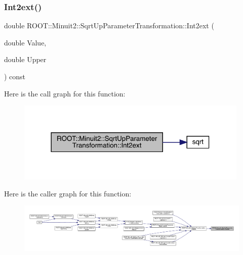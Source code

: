 \mbox{\label{classROOT_1_1Minuit2_1_1SqrtUpParameterTransformation_afd65e37e7e03cb9db5bf9906eb399fc8}} 
\subsubsection{\texorpdfstring{Int2ext()}{Int2ext()}\hspace{0.1cm}{\footnotesize\ttfamily [2/2]}}
{\footnotesize\ttfamily double R\+O\+O\+T\+::\+Minuit2\+::\+Sqrt\+Up\+Parameter\+Transformation\+::\+Int2ext (\begin{DoxyParamCaption}\item[{double}]{Value,  }\item[{double}]{Upper }\end{DoxyParamCaption}) const}

Here is the call graph for this function\+:\nopagebreak
\begin{figure}[H]
\begin{center}
\leavevmode
\includegraphics[width=314pt]{d4/d77/classROOT_1_1Minuit2_1_1SqrtUpParameterTransformation_afd65e37e7e03cb9db5bf9906eb399fc8_cgraph}
\end{center}
\end{figure}
Here is the caller graph for this function\+:\nopagebreak
\begin{figure}[H]
\begin{center}
\leavevmode
\includegraphics[width=350pt]{d4/d77/classROOT_1_1Minuit2_1_1SqrtUpParameterTransformation_afd65e37e7e03cb9db5bf9906eb399fc8_icgraph}
\end{center}
\end{figure}


